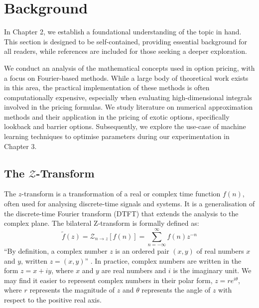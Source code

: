 \documentclass[a4paper]{report}
\begin{document}
\chapter{Background}

In Chapter 2, we establish a foundational understanding of the topic in hand. This section is designed to be self-contained, providing essential background for all readers, while references are included for those seeking a deeper exploration.

We conduct an analysis of the mathematical concepts used in option pricing, with a focus on Fourier-based methods. While a large body of theoretical work exists in this area, the practical implementation of these methods is often computationally expensive, especially when evaluating high-dimensional integrals involved in the pricing formulas. We study literature on numerical approximation methods and their application in the pricing of exotic options, specifically lookback and barrier options. Subsequently, we explore the use-case of machine learning techniques to optimise parameters during our experimentation in Chapter 3.

\section{The \texorpdfstring{$\mathcal{Z}$}{Lg}-Transform}\label{z_transform}

The $z$-transform is a transformation of a real or complex time function $f(n)$, often used for analysing discrete-time signals and systems. It is a generalisation of the discrete-time Fourier transform (DTFT) that extends the analysis to the complex plane. The bilateral Z-transform is formally defined as:
\begin{equation}\label{bilateral_z-transform}
\tilde{f}(z) = \mathcal{Z}_{n \rightarrow z}[f(n)] = \sum^{\infty}_{n = -\infty} f(n)z^{-n}
\end{equation}
``By definition, a complex number $z$ is an ordered pair $(x, y)$ of real numbers $x$ and $y$, written $z = (x, y)$'' \citep{kreyszig2010advanced}. In practice, complex numbers are written in the form $z = x + iy$, where $x$ and $y$ are real numbers and $i$ is the imaginary unit. We may find it easier to represent complex numbers in their polar form, $z = re^{i\theta}$, where $r$ represents the magnitude of $z$ and $\theta$ represents the angle of $z$ with respect to the positive real axis.
\end{document}
